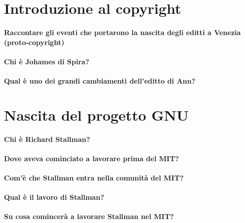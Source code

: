 \documentclass[a4paper]{article}
\begin{document}
	\section{Introduzione al copyright}
	
		\paragraph{Raccontare gli eventi che portarono la nascita degli editti a Venezia (proto-copyright)}
		
		\paragraph{Chi è Johames di Spira?} %
		
		\paragraph{Qual è uno dei grandi cambiamenti dell'editto di Ann?}
	
	
	\section{Nascita del progetto GNU}

		\paragraph{Chi è Richard Stallman?}
	
		\paragraph{Dove aveva cominciato a lavorare prima del MIT?}
	
		\paragraph{Com'è che Stallman entra nella comunità del MIT?}
	
		\paragraph{Qual è il lavoro di Stallman?}
	
		\paragraph{Su cosa comincerà a lavorare Stallman nel MIT?}
	
	
\end{document}

